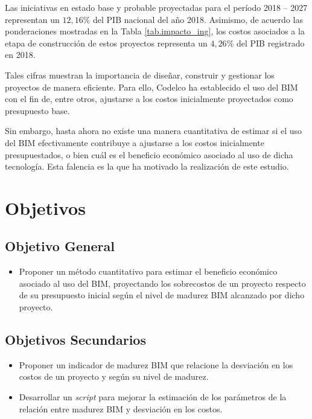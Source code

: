 Las iniciativas en estado base y probable proyectadas para el período 2018 -- 2027 representan un $12,16$\% del PIB nacional del año 2018. Asimismo, de acuerdo las ponderaciones mostradas en la Tabla \ref{tab.impacto_ing}, los costos asociados a la etapa de construcción de estos proyectos representa un $4,26$\% del PIB registrado en 2018.

Tales cifras muestran la importancia de diseñar, construir y gestionar los proyectos de manera eficiente. Para ello, Codelco ha establecido el uso del BIM con el fin de, entre otros, ajustarse a los costos inicialmente proyectados como presupuesto base.

Sin embargo, hasta ahora no existe una manera cuantitativa de estimar si el uso del BIM efectivamente contribuye a ajustarse a los costos inicialmente presupuestados, o bien cuál es el beneficio económico asociado al uso de dicha tecnología. Esta falencia es la que ha motivado la realización de este estudio.

\section{Objetivos}

\subsection{Objetivo General}

\begin{itemize}
    \item Proponer un método cuantitativo para estimar el beneficio económico asociado al uso del BIM, proyectando los sobrecostos de un proyecto respecto de su presupuesto inicial según el nivel de madurez BIM alcanzado por dicho proyecto.
\end{itemize}

\subsection{Objetivos Secundarios}

\begin{itemize}
    \item Proponer un indicador de madurez BIM que relacione la desviación en los costos de un proyecto y según su nivel de madurez.
    \item Desarrollar un \emph{script} para mejorar la estimación de los parámetros de la relación entre madurez BIM y desviación en los costos.
\end{itemize}

